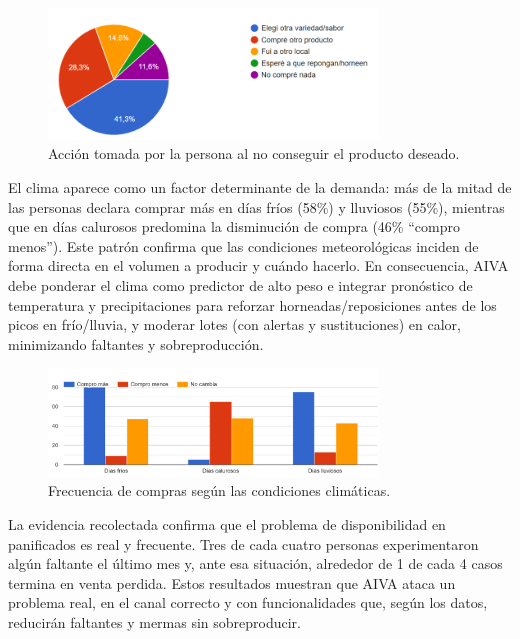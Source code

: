 \begin{figure}[t]
    \centering
    \includegraphics[width=0.78\textwidth]{images/AccionPosterior.png}
    \caption{Acción tomada por la persona al no conseguir el producto deseado.}
    \label{fig:accion-posterior}
\end{figure}


El clima aparece como un factor determinante de la demanda: más de la mitad de las personas declara comprar más en días fríos (58\%) y lluviosos (55\%), mientras que en días calurosos predomina la disminución de compra (46\% “compro menos”). Este patrón confirma que las condiciones meteorológicas inciden de forma directa en el volumen a producir y cuándo hacerlo. En consecuencia, AIVA debe ponderar el clima como predictor de alto peso e integrar pronóstico de temperatura y precipitaciones para reforzar horneadas/reposiciones antes de los picos en frío/lluvia, y moderar lotes (con alertas y sustituciones) en calor, minimizando faltantes y sobreproducción.

\begin{figure}[t]
    \centering
    \includegraphics[width=0.78\textwidth]{images/CompraSegunClima.png}
    \caption{Frecuencia de compras según las condiciones climáticas.}
    \label{fig:compras-segun-clima}
\end{figure}


La evidencia recolectada confirma que el problema de disponibilidad en panificados es real y frecuente. Tres de cada cuatro personas experimentaron algún faltante el último mes y, ante esa situación, alrededor de 1 de cada 4 casos termina en venta perdida. Estos resultados muestran que AIVA ataca un problema real, en el canal correcto y con funcionalidades que, según los datos, reducirán faltantes y mermas sin sobreproducir.


